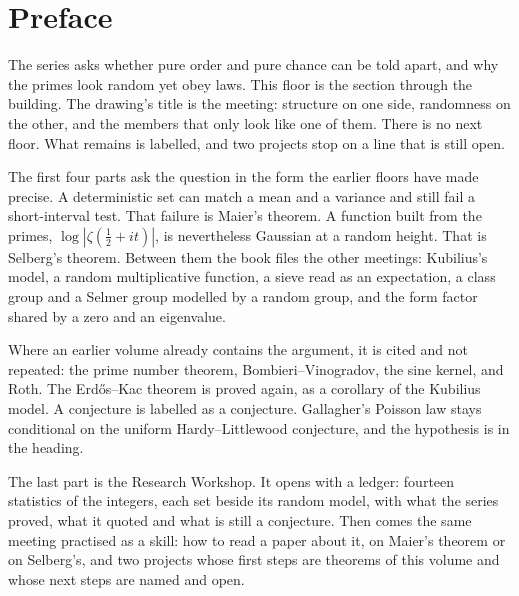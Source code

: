 \chapter*{Preface}
The series asks whether pure order and pure chance can be told apart, and why the primes look random yet obey laws. This floor is the section through the building. The drawing's title is the meeting: structure on one side, randomness on the other, and the members that only look like one of them. There is no next floor. What remains is labelled, and two projects stop on a line that is still open.

The first four parts ask the question in the form the earlier floors have made precise. A deterministic set can match a mean and a variance and still fail a short-interval test. That failure is Maier's theorem. A function built from the primes, $\log|\zeta(\tfrac12+it)|$, is nevertheless Gaussian at a random height. That is Selberg's theorem. Between them the book files the other meetings: Kubilius's model, a random multiplicative function, a sieve read as an expectation, a class group and a Selmer group modelled by a random group, and the form factor shared by a zero and an eigenvalue.

Where an earlier volume already contains the argument, it is cited and not repeated: the prime number theorem, Bombieri--Vinogradov, the sine kernel, and Roth. The Erd\H os--Kac theorem is proved again, as a corollary of the Kubilius model. A conjecture is labelled as a conjecture. Gallagher's Poisson law stays conditional on the uniform Hardy--Littlewood conjecture, and the hypothesis is in the heading.

The last part is the Research Workshop. It opens with a ledger: fourteen statistics of the integers, each set beside its random model, with what the series proved, what it quoted and what is still a conjecture. Then comes the same meeting practised as a skill: how to read a paper about it, on Maier's theorem or on Selberg's, and two projects whose first steps are theorems of this volume and whose next steps are named and open.
